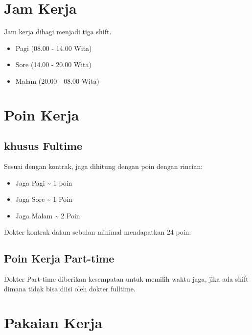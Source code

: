 \documentclass[
]{book}
\begin{document}
\hypertarget{jam-kerja}{%
\section{Jam Kerja}\label{jam-kerja}}

Jam kerja dibagi menjadi tiga shift.

\begin{itemize}
\item
  Pagi (08.00 - 14.00 Wita)
\item
  Sore (14.00 - 20.00 Wita)
\item
  Malam (20.00 - 08.00 Wita)
\end{itemize}

\hypertarget{poin-kerja}{%
\section{Poin Kerja}\label{poin-kerja}}

\hypertarget{khusus-fultime}{%
\subsection*{khusus Fultime}\label{khusus-fultime}}

Sesuai dengan kontrak, jaga dihitung dengan poin dengan rincian:

\begin{itemize}
\item
  Jaga Pagi \textasciitilde{} 1 poin
\item
  Jaga Sore \textasciitilde{} 1 Poin
\item
  Jaga Malam \textasciitilde{} 2 Poin
\end{itemize}

Dokter kontrak dalam sebulan minimal mendapatkan 24 poin.

\hypertarget{poin-kerja-part-time}{%
\subsection*{Poin Kerja Part-time}\label{poin-kerja-part-time}}

Dokter Part-time diberikan kesempatan untuk memilih waktu jaga, jika ada shift dimana tidak bisa diisi oleh dokter fulltime.

\hypertarget{pakaian-kerja}{%
\section{Pakaian Kerja}\label{pakaian-kerja}}
\end{document}
